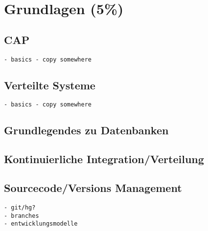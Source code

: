 \chapter{Grundlagen (5\%)}
\section{CAP}

\begin{verbatim}
- basics - copy somewhere
\end{verbatim}

\section{Verteilte Systeme}

\begin{verbatim}
- basics - copy somewhere
\end{verbatim}

\section{Grundlegendes zu Datenbanken}


\section{Kontinuierliche Integration/Verteilung}

\section{Sourcecode/Versions Management}

\begin{verbatim}
- git/hg?
- branches
- entwicklungsmodelle
\end{verbatim}
